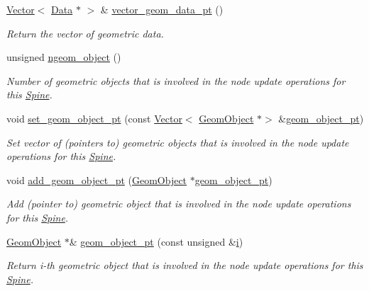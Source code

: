 \begin{DoxyCompactItemize}
\hyperlink{classoomph_1_1Vector}{Vector}$<$ \hyperlink{classoomph_1_1Data}{Data} $\ast$ $>$ \& \hyperlink{classoomph_1_1Spine_a930bb511049f50d2a248277c5ffb7d68}{vector\+\_\+geom\+\_\+data\+\_\+pt} ()
\begin{DoxyCompactList}\small\item\em Return the vector of geometric data. \end{DoxyCompactList}\item 
unsigned \hyperlink{classoomph_1_1Spine_a4ed777b5f3b4b1e464835ba945003877}{ngeom\+\_\+object} ()
\begin{DoxyCompactList}\small\item\em Number of geometric objects that is involved in the node update operations for this \hyperlink{classoomph_1_1Spine}{Spine}. \end{DoxyCompactList}\item 
void \hyperlink{classoomph_1_1Spine_a7069dfe59a9f4c1ad487adf606f5931a}{set\+\_\+geom\+\_\+object\+\_\+pt} (const \hyperlink{classoomph_1_1Vector}{Vector}$<$ \hyperlink{classoomph_1_1GeomObject}{Geom\+Object} $\ast$$>$ \&\hyperlink{classoomph_1_1Spine_a68253ccfbfdf33e773dd300dcc4ec42c}{geom\+\_\+object\+\_\+pt})
\begin{DoxyCompactList}\small\item\em Set vector of (pointers to) geometric objects that is involved in the node update operations for this \hyperlink{classoomph_1_1Spine}{Spine}. \end{DoxyCompactList}\item 
void \hyperlink{classoomph_1_1Spine_adf9717dda0fb1b5fd99e50e4737d9706}{add\+\_\+geom\+\_\+object\+\_\+pt} (\hyperlink{classoomph_1_1GeomObject}{Geom\+Object} $\ast$\hyperlink{classoomph_1_1Spine_a68253ccfbfdf33e773dd300dcc4ec42c}{geom\+\_\+object\+\_\+pt})
\begin{DoxyCompactList}\small\item\em Add (pointer to) geometric object that is involved in the node update operations for this \hyperlink{classoomph_1_1Spine}{Spine}. \end{DoxyCompactList}\item 
\hyperlink{classoomph_1_1GeomObject}{Geom\+Object} $\ast$\& \hyperlink{classoomph_1_1Spine_a68253ccfbfdf33e773dd300dcc4ec42c}{geom\+\_\+object\+\_\+pt} (const unsigned \&\hyperlink{cfortran_8h_adb50e893b86b3e55e751a42eab3cba82}{i})
\begin{DoxyCompactList}\small\item\em Return i-\/th geometric object that is involved in the node update operations for this \hyperlink{classoomph_1_1Spine}{Spine}. \end{DoxyCompactList}\item 
$$
\end{DoxyCompactItemize}
